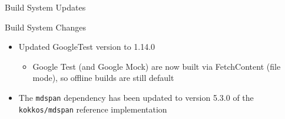 
\begin{frame}[fragile]

  {\Huge Build System Updates}

  \vspace{10pt}

\end{frame}

\begin{frame}[fragile]{Build System Changes}
  \begin{itemize}
      \item Updated GoogleTest version to 1.14.0
      \begin{itemize}
        \item Google Test (and Google Mock) are now built via FetchContent (file mode), so offline builds are still default
      \end{itemize}
      \item The \texttt{mdspan} dependency has been updated to version 5.3.0 of the \texttt{kokkos/mdspan} reference implementation
  \end{itemize}
\end{frame}





%


